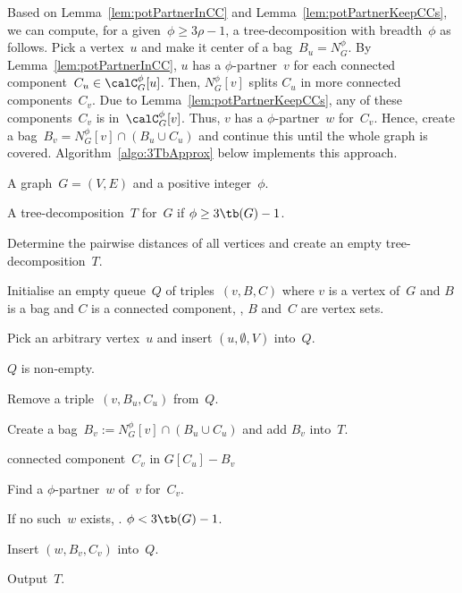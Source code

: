 Based on Lemma~\ref{lem:potPartnerInCC} and Lemma~\ref{lem:potPartnerKeepCCs}, we can compute, for a given~$\phi \geq 3 \rho - 1$, a tree-decomposition with breadth~$\phi$ as follows.
Pick a vertex~$u$ and make it center of a bag~$B_u = N_G^\phi$.
By Lemma~\ref{lem:potPartnerInCC}, $u$ has a $\phi$-partner~$v$ for each connected component~$C_u \in \calC_G^\phi[u]$.
Then, $N_G^\phi[v]$ splits $C_u$ in more connected components~$C_v$.
Due to Lemma~\ref{lem:potPartnerKeepCCs}, any of these components~$C_v$ is in~$\calC_G^\phi[v]$.
Thus, $v$ has a $\phi$-partner~$w$ for~$C_v$.
Hence, create a bag~$B_v = N_G^\phi[v] \cap (B_u \cup C_u)$ and continue this until the whole graph is covered.
Algorithm~\ref{algo:3TbApprox} below implements this approach.

\begin{algorithm}
    [!htb]
    \caption
    {%
        Constructs, for a given graph~$G = (V, E)$ and a given positive integer~$\phi$, a tree-decomposition~$T$ with breadth~$\phi$.
    }
    \label{algo:3TbApprox}

\KwIn
{%
    A graph~$G = (V, E)$ and a positive integer~$\phi$.
}

\KwOut
{%
    A tree-decomposition~$T$ for~$G$ if $\phi \geq 3 \tb(G) - 1$.
}

Determine the pairwise distances of all vertices and create an empty tree-decomposition~$T$.
\label{line:3Tb_Distances}

Initialise an empty queue~$Q$ of triples~$(v, B, C)$ where $v$ is a vertex of~$G$ and $B$ is a bag and $C$ is a connected component, \ie, $B$ and~$C$ are vertex sets.
\label{line:3Tb_InitQ}

Pick an arbitrary vertex~$u$ and insert $(u, \emptyset, V)$ into~$Q$.
\label{line:3Tb_PickU}

\While
{%
    \( Q \) is non-empty.%
    \label{line:3Tb_Qloop}
}
{%
    Remove a triple~$(v, B_u, C_u)$ from~$Q$.

    Create a bag~$B_v := N_G^\phi[v] \cap (B_u \cup C_u)$ and add $B_v$ into~$T$.
    \label{line:3Tb_createBv}

    \ForEach
    {%
        connected component~\( C_v \) in \( G[C_u] - B_v \)
    }
    {%
        Find a $\phi$-partner~$w$ of~$v$ for~$C_v$.
        \label{line:3Tb_findPotPart}

        If no such~$w$ exists, . $\phi < 3 \tb(G) - 1$.

        Insert $(w, B_v, C_v)$ into~$Q$.
        \label{line:3Tb_InsertTriple}
    }
}

Output~$T$.
\end{algorithm}

